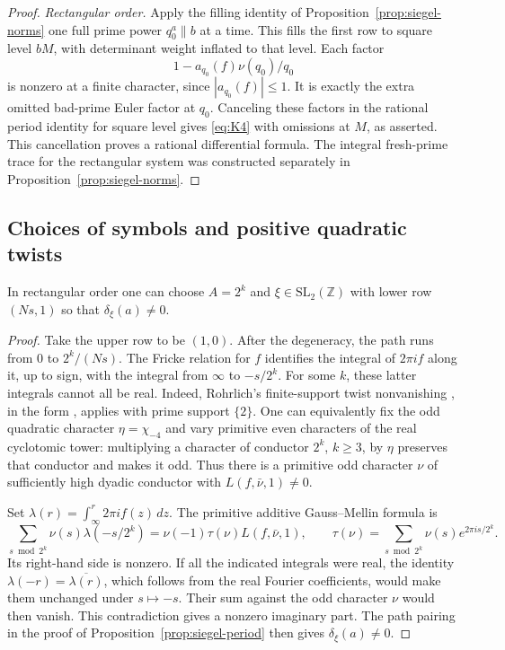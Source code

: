 \begin{proof}
\emph{Rectangular order.}
Apply the filling identity of Proposition~\ref{prop:siegel-norms}
one full prime power \(q_0^a\parallel b\) at a time.
This fills the first row to square level \(bM\), with determinant
weight inflated to that level.  Each factor
\[
                         1-a_{q_0}(f)\nu(q_0)/q_0
\]
is nonzero at a finite character, since \(|a_{q_0}(f)|\leq1\).
It is exactly the extra omitted bad-prime Euler factor at \(q_0\).
Canceling these factors in the rational period identity for square
level gives \eqref{eq:K4} with omissions at \(M\), as asserted.
This cancellation proves a rational differential formula.  The
integral fresh-prime trace for the rectangular system was constructed
separately in Proposition~\ref{prop:siegel-norms}.
\end{proof}

\subsection{Choices of symbols and positive quadratic twists}

\begin{lemma}\label{lem:siegel-rectangular-symbol}
In rectangular order one can choose \(A=2^k\) and
\(\xi\in\mathrm{SL}_2(\mathbb Z)\) with lower row \((Ns,1)\) so that
\(\delta_\xi(a)\ne0\).
\end{lemma}

\begin{proof}
Take the upper row to be \((1,0)\).  After the degeneracy, the path
runs from \(0\) to \(2^k/(Ns)\).
The Fricke relation for \(f\) identifies the integral of \(2\pi i f\)
along it, up to sign, with the integral from \(\infty\) to
\(-s/2^k\).  For some \(k\), these latter integrals cannot all be real.
Indeed, Rohrlich's finite-support twist nonvanishing
\cite{Rohrlich88}, in the form \cite[Theorem~13.5(2)]{Kato04}, applies
with prime support \(\{2\}\).  One can equivalently fix the odd
quadratic character \(\eta=\chi_{-4}\) and vary primitive even
characters of the real cyclotomic tower: multiplying a character of
conductor \(2^k\), \(k\geq3\), by \(\eta\) preserves that conductor
and makes it odd.  Thus there is a primitive odd character \(\nu\)
of sufficiently high dyadic conductor with
\(L(f,\bar\nu,1)\ne0\).

Set \(\lambda(r)=\int_\infty^r2\pi i f(z)\,dz\).  The primitive
additive Gauss--Mellin formula is
\[
 \sum_{s\bmod 2^k}\nu(s)\lambda(-s/2^k)
       =\nu(-1)\tau(\nu)L(f,\bar\nu,1),\qquad
 \tau(\nu)=\sum_{s\bmod2^k}\nu(s)e^{2\pi i s/2^k}.
\]
Its right-hand side is nonzero.  If all the indicated integrals were
real, the identity \(\lambda(-r)=\overline{\lambda(r)}\), which
follows from the real Fourier coefficients, would make them unchanged
under \(s\mapsto-s\).  Their sum against the odd character \(\nu\)
would then vanish.  This contradiction gives a nonzero imaginary part.
The path pairing in the proof of
Proposition~\ref{prop:siegel-period} then gives
\(\delta_\xi(a)\ne0\).
\end{proof}

